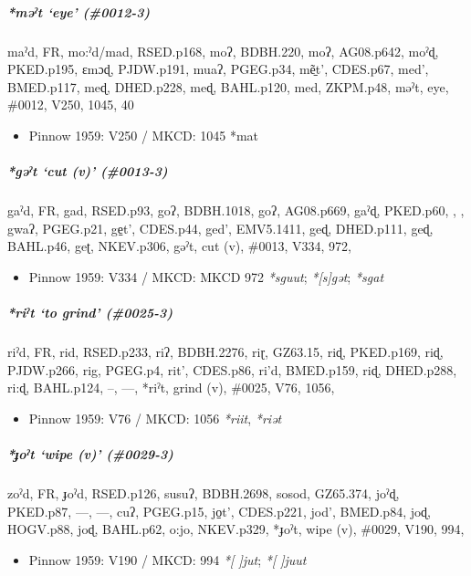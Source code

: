 \documentclass[a4paper,]{article}
\providecommand{\tightlist}{%
  \setlength{\itemsep}{0pt}\setlength{\parskip}{0pt}}
\let\oldsubparagraph\subparagraph
\renewcommand{\subparagraph}[1]{\oldsubparagraph{#1}\mbox{}}
\begin{document}
\subparagraph{\texorpdfstring{\emph{*məˀt} `eye'
(\#0012-3)}{*məˀt eye (\#0012-3)}}\label{mux259ux2c0t-eye-0012-3}

maˀd, FR, mo:ˀd/mad, RSED.p168, moʔ, BDBH.220, moʔ, AG08.p642, moˀɖ,
PKED.p195, ɛmɔɖ, PJDW.p191, muaʔ, PGEG.p34, mẽ̠t', CDES.p67, med',
BMED.p117, meɖ, DHED.p228, meɖ, BAHL.p120, med, ZKPM.p48, məˀt, eye,
\#0012, V250, 1045, 40

\begin{itemize}
\tightlist
\item
  Pinnow 1959: V250 / MKCD: 1045 *mat
\end{itemize}

\subparagraph{\texorpdfstring{\emph{*gəˀt} `cut (v)'
(\#0013-3)}{*gəˀt cut (v) (\#0013-3)}}\label{gux259ux2c0t-cut-v-0013-3}

gaˀd, FR, gad, RSED.p93, goʔ, BDBH.1018, goʔ, AG08.p669, gaˀɖ, PKED.p60,
, , gwaʔ, PGEG.p21, ge̠t', CDES.p44, ged', EMV5.1411, geɖ, DHED.p111,
geɖ, BAHL.p46, geʈ, NKEV.p306, gəˀt, cut (v), \#0013, V334, 972,

\begin{itemize}
\tightlist
\item
  Pinnow 1959: V334 / MKCD: MKCD 972 \emph{*sguut}; \emph{*{[}s{]}gət};
  \emph{*sgat}
\end{itemize}

\subparagraph{\texorpdfstring{\emph{*riˀt} `to grind'
(\#0025-3)}{*riˀt to grind (\#0025-3)}}\label{riux2c0t-to-grind-0025-3}

riˀd, FR, rid, RSED.p233, riʔ, BDBH.2276, riɽ, GZ63.15, riɖ, PKED.p169,
riɖ, PJDW.p266, rig, PGEG.p4, rit', CDES.p86, ri'd, BMED.p159, riɖ,
DHED.p288, ri:ɖ, BAHL.p124, --, ---, *riˀt, grind (v), \#0025, V76,
1056,

\begin{itemize}
\tightlist
\item
  Pinnow 1959: V76 / MKCD: 1056 \emph{*riit}, \emph{*riət}
\end{itemize}

\subparagraph{\texorpdfstring{\emph{*ɟoˀt} `wipe (v)'
(\#0029-3)}{*ɟoˀt wipe (v) (\#0029-3)}}\label{ux25foux2c0t-wipe-v-0029-3}

zoˀd, FR, ɟoˀd, RSED.p126, susuʔ, BDBH.2698, sosod, GZ65.374, joˀɖ,
PKED.p87, ---, ---, cuʔ, PGEG.p15, jo̠t', CDES.p221, jod', BMED.p84, joɖ,
HOGV.p88, joɖ, BAHL.p62, o:jo, NKEV.p329, *ɟoˀt, wipe (v), \#0029, V190,
994,

\begin{itemize}
\tightlist
\item
  Pinnow 1959: V190 / MKCD: 994 \emph{*{[} {]}jut}; \emph{*{[} {]}juut}
\end{itemize}
\end{document}
